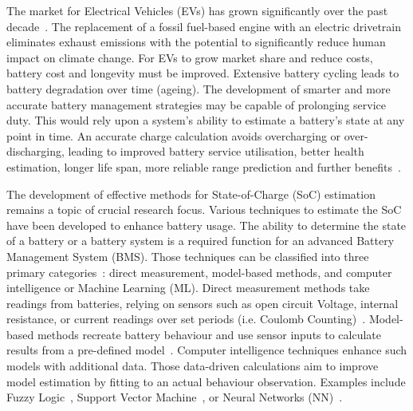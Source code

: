  {
    The market for Electrical Vehicles (EVs) has grown significantly over the past decade~\cite{state-ev-australia}.
    The replacement of a fossil fuel-based engine with an electric drivetrain eliminates exhaust emissions with the potential to significantly reduce human impact on climate change.
    For EVs to grow market share and reduce costs, battery cost and longevity must be improved.
    Extensive battery cycling leads to battery degradation over time (ageing).
    The development of smarter and more accurate battery management strategies may be capable of prolonging service duty.
    This would rely upon a system's ability to estimate a battery's state at any point in time.
    An accurate charge calculation avoids overcharging or over-discharging, leading to improved battery service utilisation, better health estimation, longer life span, more reliable range prediction and further benefits~\cite{calif_proper_2008}.
}

%
The development of effective methods for State-of-Charge (SoC) estimation remains a topic of crucial research focus.
Various techniques to estimate the SoC have been developed to enhance battery usage.
The ability to determine the state of a battery or a battery system is a required function for an advanced Battery Management System (BMS).
Those techniques can be classified into three primary categories~\cite{ali_towards_2019,ng_enhanced_2009,robust_SoC,6953745}: direct measurement, model-based methods, and computer intelligence or Machine Learning (ML).
Direct measurement methods take readings from batteries, relying on sensors such as open circuit Voltage, internal resistance, or current readings over set periods (i.e. Coulomb Counting)~\cite{ng_enhanced_2009,robust_SoC}.
Model-based methods recreate battery behaviour and use sensor inputs to calculate results from a pre-defined model~\cite{6953745}.
Computer intelligence techniques enhance such models with additional data.
Those data-driven calculations aim to improve model estimation by fitting to an actual behaviour observation.
Examples include Fuzzy Logic~\cite{malkhandi_fuzzy_2006}, Support Vector Machine~\cite{hansen_support_2005, anton_battery_2013}, or Neural Networks (NN)~\cite{song_lithium-ion_2018,Chemali2017,mamo_long_2020,jiao_gru-rnn_2020,xiao_accurate_2019,javid_adaptive_2020,zhang_deep_2020}.

